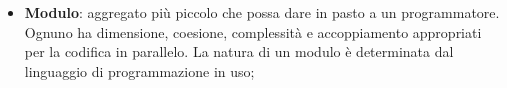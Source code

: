\begin{itemize}
	\item \textbf{Modulo}: aggregato più piccolo che possa dare in pasto a un programmatore. Ognuno ha dimensione, coesione, complessità e accoppiamento appropriati per la codifica in parallelo. La natura di un modulo è determinata dal linguaggio di programmazione in uso;


\end{itemize}